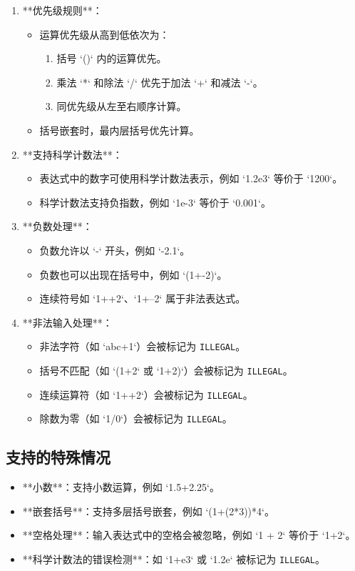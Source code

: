 \documentclass[UTF8]{ctexart}
\begin{document}
\begin{enumerate}
    \item **优先级规则**：
        \begin{itemize}
            \item 运算优先级从高到低依次为：
                \begin{enumerate}
                    \item 括号 `()` 内的运算优先。
                    \item 乘法 `*` 和除法 `/` 优先于加法 `+` 和减法 `-`。
                    \item 同优先级从左至右顺序计算。
                \end{enumerate}
            \item 括号嵌套时，最内层括号优先计算。
        \end{itemize}
    \item **支持科学计数法**：
        \begin{itemize}
            \item 表达式中的数字可使用科学计数法表示，例如 `1.2e3` 等价于 `1200`。
            \item 科学计数法支持负指数，例如 `1e-3` 等价于 `0.001`。
        \end{itemize}
    \item **负数处理**：
        \begin{itemize}
            \item 负数允许以 `-` 开头，例如 `-2.1`。
            \item 负数也可以出现在括号中，例如 `(1+-2)`。
            \item 连续符号如 `1++2`、`1+--2` 属于非法表达式。
        \end{itemize}
    \item **非法输入处理**：
        \begin{itemize}
            \item 非法字符（如 `abc+1`）会被标记为 \texttt{ILLEGAL}。
            \item 括号不匹配（如 `(1+2` 或 `1+2)`）会被标记为 \texttt{ILLEGAL}。
            \item 连续运算符（如 `1++2`）会被标记为 \texttt{ILLEGAL}。
            \item 除数为零（如 `1/0`）会被标记为 \texttt{ILLEGAL}。
        \end{itemize}
\end{enumerate}

\subsection{支持的特殊情况}
\begin{itemize}
    \item **小数**：支持小数运算，例如 `1.5+2.25`。
    \item **嵌套括号**：支持多层括号嵌套，例如 `(1+(2*3))*4`。
    \item **空格处理**：输入表达式中的空格会被忽略，例如 `1 + 2` 等价于 `1+2`。
    \item **科学计数法的错误检测**：如 `1+e3` 或 `1.2e` 被标记为 \texttt{ILLEGAL}。
\end{itemize}
\end{document}
